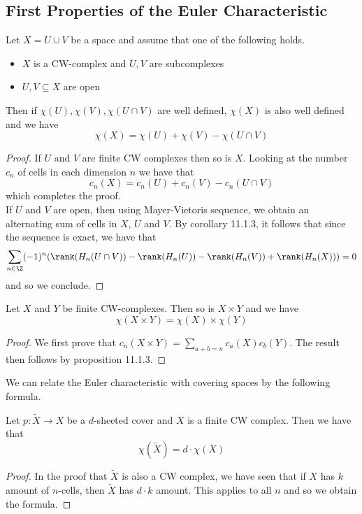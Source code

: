 \documentclass[a4paper]{article}
\begin{document}
\subsection{First Properties of the Euler Characteristic}
\begin{prp}{}{} Let $X=U\cup V$ be a space and assume that one of the following holds. 
\begin{itemize}
\item $X$ is a CW-complex and $U,V$ are subcomplexes
\item $U,V\subseteq X$ are open
\end{itemize}
Then if $\chi(U),\chi(V),\chi(U\cap V)$ are well defined, $\chi(X)$ is also well defined and we have $$\chi(X)=\chi(U)+\chi(V)-\chi(U\cap V)$$ 
\begin{proof}
If $U$ and $V$ are finite CW complexes then so is $X$. Looking at the number $c_n$ of cells in each dimension $n$ we have that $$c_n(X)=c_n(U)+c_n(V)-c_n(U\cap V)$$ which completes the proof. \\

If $U$ and $V$ are open, then using Mayer-Vietoris sequence, we obtain an alternating sum of cells in $X$, $U$ and $V$. By corollary 11.1.3, it follows that since the sequence is exact, we have that $$\sum_{n\in\Z}(-1)^n(\rank(H_n(U\cap V))-\rank(H_n(U))-\rank(H_n(V))+\rank(H_n(X)))=0$$ and so we conclude. 
\end{proof}
\end{prp}

\begin{prp}{}{} Let $X$ and $Y$ be finite CW-complexes. Then so is $X\times Y$ and we have $$\chi(X\times Y)=\chi(X)\times\chi(Y)$$ 
\begin{proof}
We first prove that $c_n(X\times Y)=\sum_{a+b=n}c_a(X)c_b(Y)$. The result then follows by proposition 11.1.3. 
\end{proof}
\end{prp}

We can relate the Euler characteristic with covering spaces by the following formula. 

\begin{prp}{}{} Let $p:\tilde{X}\to X$ be a $d$-sheeted cover and $X$ is a finite CW complex. Then we have that $$\chi(\tilde{X})=d\cdot\chi(X)$$ 
\begin{proof}
In the proof that $\tilde{X}$ is also a CW complex, we have seen that if $X$ has $k$ amount of $n$-cells, then $\tilde{X}$ has $d\cdot k$ amount. This applies to all $n$ and so we obtain the formula. 
\end{proof}
\end{prp}
\end{document}
